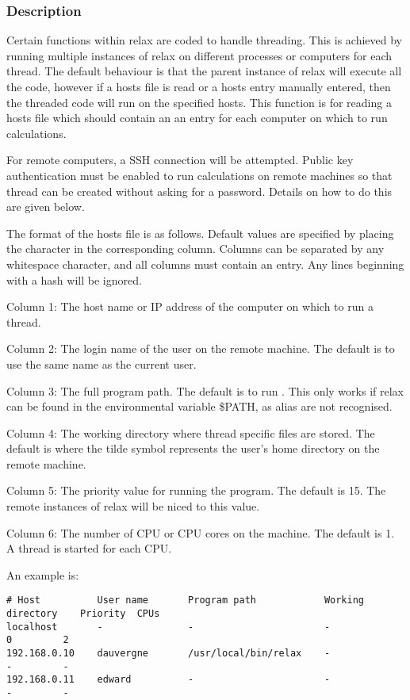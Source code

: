 \subsubsection{Description}

Certain functions within relax are coded to handle threading.  This is achieved by running multiple instances of relax on different processes or computers for each thread.  The default behaviour is that the parent instance of relax will execute all the code, however if a hosts file is read or a hosts entry manually entered, then the threaded code will run on the specified hosts.  This function is for reading a hosts file which should contain an an entry for each computer on which to run calculations.


For remote computers, a SSH connection will be attempted.  Public key authentication must be enabled to run calculations on remote machines so that thread can be created without asking for a password.  Details on how to do this are given below.


The format of the hosts file is as follows.  Default values are specified by placing the character \quotecmd{-} in the corresponding column.  Columns can be separated by any whitespace character, and all columns must contain an entry.  Any lines beginning with a hash will be ignored.


Column 1:  The host name or IP address of the computer on which to run a thread.


Column 2:  The login name of the user on the remote machine.  The default is to use the same name as the current user.


Column 3:  The full program path.  The default is to run .  This only works if relax can be found in the environmental variable \$PATH, as alias are not recognised.


Column 4:  The working directory where thread specific files are stored.  The default is  where the tilde \quotecmd{\~{}} symbol represents the user's home directory on the remote machine.


Column 5:  The priority value for running the program.  The default is 15.  The remote instances of relax will be niced to this value.


Column 6:  The number of CPU or CPU cores on the machine.  The default is 1.  A thread is started for each CPU.


An example is:


{\footnotesize \begin{verbatim}
# Host          User name       Program path            Working directory    Priority  CPUs
localhost       -               -                       -                    0         2
192.168.0.10    dauvergne       /usr/local/bin/relax    -                    -         -
192.168.0.11    edward          -                       -                    -         -
\end{verbatim}}

